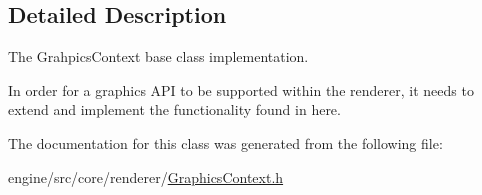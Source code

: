 \subsection{Detailed Description}
The Grahpics\+Context base class implementation. 

In order for a graphics A\+PI to be supported within the renderer, it needs to extend and implement the functionality found in here. 

The documentation for this class was generated from the following file\+:\begin{DoxyCompactItemize}
\item 
engine/src/core/renderer/\hyperlink{GraphicsContext_8h}{Graphics\+Context.\+h}\end{DoxyCompactItemize}
